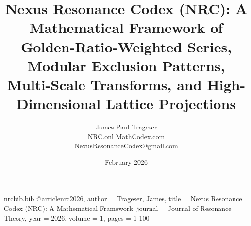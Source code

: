 \begin{filecontents}{nrcbib.bib}
@article{nrc2026,
  author = {Trageser, James},
  title = {Nexus Resonance Codex (NRC): A Mathematical Framework},
  journal = {Journal of Resonance Theory},
  year = {2026},
  volume = {1},
  pages = {1-100}
}
\end{filecontents}

\documentclass[11pt,a4paper]{article}

\usepackage[utf8]{inputenc}
\usepackage[T1]{fontenc}
\usepackage{lmodern}
\usepackage[english]{babel}
\usepackage{microtype}
\usepackage{amsmath,amssymb,amsthm,amsfonts,mathtools}
\usepackage[margin=1in]{geometry}
\usepackage{hyperref}
\usepackage{booktabs}
\usepackage{siunitx}
\usepackage{listings}
\usepackage{xcolor}
\usepackage{algorithm}
\usepackage{algorithmicx}
\usepackage{algpseudocode}
\usepackage{float}
\usepackage[most]{tcolorbox}
\usepackage{pgfplots}
\pgfplotsset{compat=1.18}
\usepackage{caption}
\usepackage{subcaption}
\usepackage{titlesec}
\usepackage{bookmark}
\usepackage{csquotes}
\usepackage{enumitem}
\usepackage[title]{appendix}

\usepackage{nrc}



\title{Nexus Resonance Codex (NRC): A Mathematical Framework of Golden-Ratio-Weighted Series, Modular Exclusion Patterns, Multi-Scale Transforms, and High-Dimensional Lattice Projections}

\author{James Paul Trageser \\
        \href{https://NRC.onl}{NRC.onl} \quad \href{https://MathCodex.com}{MathCodex.com} \\
        \href{mailto:NexusResonanceCodex@gmail.com}{NexusResonanceCodex@gmail.com}}

\date{February 2026}



\maketitle

